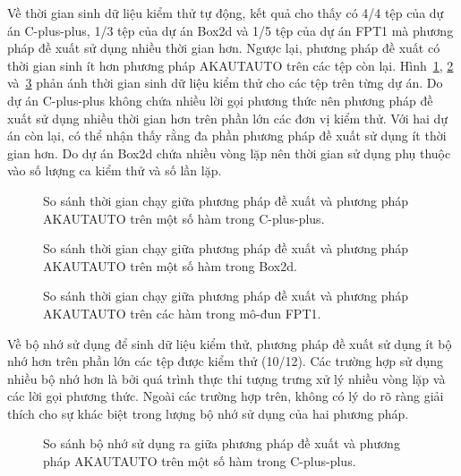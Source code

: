 Về thời gian sinh dữ liệu kiểm thử tự động, kết quả cho thấy có 4/4 tệp của dự án C-plus-plus, 1/3 tệp của dự án Box2d và 1/5 tệp của dự án FPT1 mà phương pháp đề xuất sử dụng nhiều thời gian hơn. Ngược lại, phương pháp đề xuất có thời gian sinh ít hơn phương pháp AKAUTAUTO trên các tệp còn lại. Hình~\ref{fig:time-algo}, \ref{fig:time-box2d} và~\ref{fig:time-serviceproxy} phản ánh thời gian sinh dữ liệu kiểm thử cho các tệp trên từng dự án. Do dự án C-plus-plus không chứa nhiều lời gọi phương thức nên phương pháp đề xuất sử dụng nhiều thời gian hơn trên phần lớn các đơn vị kiểm thử. Với hai dự án còn lại, có thể nhận thấy rằng đa phần phương pháp đề xuất sử dụng ít thời gian hơn. Do dự án Box2d chứa nhiều vòng lặp nên thời gian sử dụng phụ thuộc vào số lượng ca kiểm thử và số lần lặp.

\begin{figure}[H]
    \centering
    
    \caption{So sánh thời gian chạy giữa phương pháp đề xuất và phương pháp AKAUTAUTO trên một số hàm trong C-plus-plus.}
    \label{fig:time-algo}
\end{figure}

\begin{figure}[H]
	\centering
	
	\caption{So sánh thời gian chạy giữa phương pháp đề xuất và phương pháp AKAUTAUTO trên một số hàm trong Box2d.}
	\label{fig:time-box2d}
\end{figure}

\begin{figure}[H]
	\centering
	
	\caption{So sánh thời gian chạy giữa phương pháp đề xuất và phương pháp AKAUTAUTO trên các hàm trong mô-đun FPT1.}
	\label{fig:time-serviceproxy}
\end{figure}

Về bộ nhớ sử dụng để sinh dữ liệu kiểm thử, phương pháp đề xuất sử dụng ít bộ nhớ hơn trên phần lớn các tệp được kiểm thử (10/12). Các trường hợp sử dụng nhiều bộ nhớ hơn là bởi quá trình thực thi tượng trưng xử lý nhiều vòng lặp và các lời gọi phương thức. Ngoài các trường hợp trên, không có lý do rõ ràng giải thích cho sự khác biệt trong lượng bộ nhớ sử dụng của hai phương pháp.

\begin{figure}[H]
    \centering
    
    \caption{So sánh bộ nhớ sử dụng ra giữa phương pháp đề xuất và phương pháp AKAUTAUTO trên một số hàm trong C-plus-plus.}
    \label{fig:mem-algo}
\end{figure}

